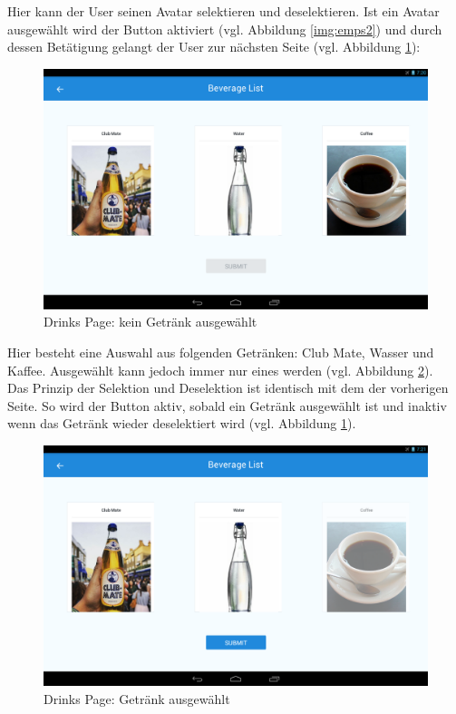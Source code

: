 Hier kann der User seinen Avatar selektieren und deselektieren. Ist ein Avatar ausgewählt wird der  Button aktiviert (vgl. Abbildung \ref{img:emps2}) und durch dessen Betätigung gelangt der User zur nächsten Seite (vgl. Abbildung \ref{img:drinks1}): 

\begin{figure}[th!]
	\centering
	\includegraphics[width=.9\columnwidth]{./Abbildungen/Kapitel_03/drinks1.png}
	\caption{Drinks Page: kein Getränk ausgewählt}
	\label{img:drinks1}
\end{figure}

Hier besteht eine Auswahl aus folgenden Getränken: Club Mate, Wasser und Kaffee. 
Ausgewählt kann jedoch immer nur eines werden (vgl. Abbildung \ref{img:drinks2}).\\
Das Prinzip der Selektion und Deselektion ist identisch mit dem der vorherigen Seite. So wird der  Button aktiv, sobald ein Getränk ausgewählt ist und inaktiv wenn das Getränk wieder deselektiert wird (vgl. Abbildung \ref{img:drinks1}).\\

\begin{figure}[th!]
	\centering
	\includegraphics[width=.9\columnwidth]{./Abbildungen/Kapitel_03/drinks2.png}
	\caption{Drinks Page: Getränk ausgewählt}
	\label{img:drinks2}
\end{figure}

